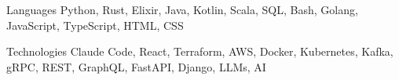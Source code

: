 

\begin{cvskills}

  \cvskill
    {Languages} %
    {Python, Rust, Elixir, Java, Kotlin, Scala, SQL, Bash, Golang, JavaScript, TypeScript, HTML, CSS} %

  \cvskill
    {Technologies} %
    {Claude Code, React, Terraform, AWS, Docker, Kubernetes, Kafka, gRPC, REST, GraphQL, FastAPI, Django, LLMs, AI} %

\end{cvskills}
